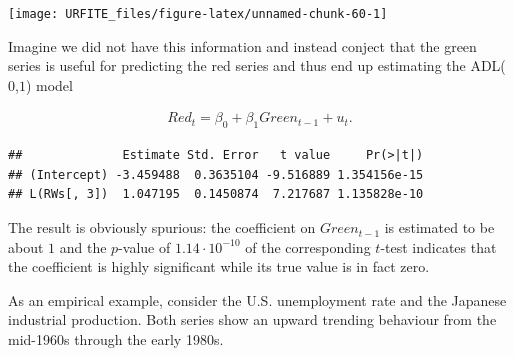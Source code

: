 \documentclass[]{book}
\newenvironment{Shaded}{\begin{snugshade}}{\end{snugshade}}
\newcommand{\KeywordTok}[1]{\textcolor[rgb]{0.13,0.29,0.53}{\textbf{#1}}}
\newcommand{\DecValTok}[1]{\textcolor[rgb]{0.00,0.00,0.81}{#1}}
\newcommand{\StringTok}[1]{\textcolor[rgb]{0.31,0.60,0.02}{#1}}
\newcommand{\CommentTok}[1]{\textcolor[rgb]{0.56,0.35,0.01}{\textit{#1}}}
\newcommand{\OperatorTok}[1]{\textcolor[rgb]{0.81,0.36,0.00}{\textbf{#1}}}
\newcommand{\NormalTok}[1]{#1}
\theoremstyle{definition}
\theoremstyle{definition}
\theoremstyle{definition}
\theoremstyle{remark}
\begin{document}
\begin{center}\texttt{[image: URFITE\_files/figure-latex/unnamed-chunk-60-1]} \end{center}

Imagine we did not have this information and instead conject that the
green series is useful for predicting the red series and thus end up
estimating the ADL(\(0\),\(1\)) model

\begin{align*}
  Red_t = \beta_0 + \beta_1 Green_{t-1} + u_t.
\end{align*}

\begin{Shaded}
\end{Shaded}

\begin{verbatim}
##              Estimate Std. Error   t value     Pr(>|t|)
## (Intercept) -3.459488  0.3635104 -9.516889 1.354156e-15
## L(RWs[, 3])  1.047195  0.1450874  7.217687 1.135828e-10
\end{verbatim}

The result is obviously spurious: the coefficient on \(Green_{t-1}\) is
estimated to be about \(1\) and the \(p\)-value of
\(1.14 \cdot 10^{-10}\) of the corresponding \(t\)-test indicates that
the coefficient is highly significant while its true value is in fact
zero.

As an empirical example, consider the U.S. unemployment rate and the
Japanese industrial production. Both series show an upward trending
behaviour from the mid-1960s through the early 1980s.
\end{document}
